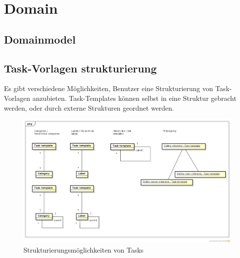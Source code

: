 	\section{Domain} 
		\subsection{Domainmodel}
		
		
		
		\subsection{Task-Vorlagen strukturierung}
			Es gibt verschiedene Möglichkeiten, 
			Benutzer eine Strukturierung von Task-Vorlagen anzubieten.
			Task-Templates können selbst in eine Struktur gebracht werden, 
			oder durch externe Strukturen geordnet werden.
		
			\begin{figure}[H]
				\includegraphics[width=\textwidth]{architecture/media/img/taskTemplateStructure.png}
				\centering
				\caption{Strukturierungsmöglichkeiten von Tasks}
				\label{fig:taskTemplateStructure}
			\end{figure}
			

